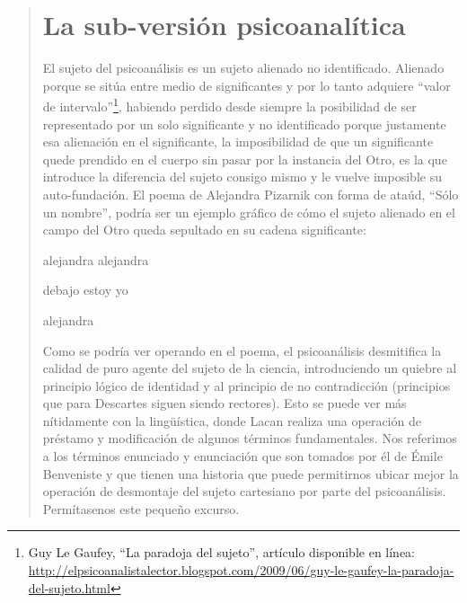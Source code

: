 \begin{quote}
\section{La sub-versión psicoanalítica}

El sujeto del psicoanálisis es un sujeto alienado no identificado. Alienado porque se sitúa entre medio de significantes y por lo tanto adquiere \enquote{valor de intervalo}\footnote{Guy Le Gaufey, \enquote{La paradoja del sujeto}, artículo disponible en línea: \url{http://elpsicoanalistalector.blogspot.com/2009/06/guy-le-gaufey-la-paradoja-del-sujeto.html}}, habiendo perdido desde siempre la posibilidad de ser representado por un solo significante y no identificado porque justamente esa alienación en el significante, la imposibilidad de que un significante quede prendido en el cuerpo sin pasar por la instancia del Otro, es la que introduce la diferencia del sujeto consigo mismo y le vuelve imposible su auto-fundación. El poema de Alejandra Pizarnik con forma de ataúd, \enquote{Sólo un nombre}, podría ser un ejemplo gráfico de cómo el sujeto alienado en el campo del Otro queda sepultado en su cadena significante:

alejandra alejandra

debajo estoy yo

alejandra

Como se podría ver operando en el poema, el psicoanálisis desmitifica la calidad de puro agente del sujeto de la ciencia, introduciendo un quiebre al principio lógico de identidad y al principio de no contradicción (principios que para Descartes siguen siendo rectores). Esto se puede ver más nítidamente con la lingüística, donde Lacan realiza una operación de préstamo y modificación de algunos términos fundamentales. Nos referimos a los términos enunciado y enunciación que son tomados por él de Émile Benveniste y que tienen una historia que puede permitirnos ubicar mejor la operación de desmontaje del sujeto cartesiano por parte del psicoanálisis. Permítasenos este pequeño excurso.


\end{quote}
